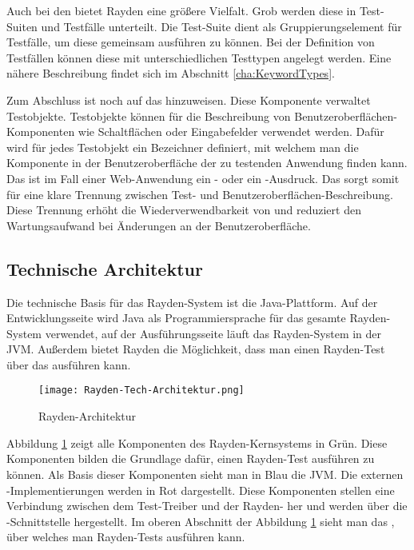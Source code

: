 \SuperPar
Auch bei den  bietet Rayden eine größere Vielfalt. Grob werden diese in Test-Suiten und Testfälle unterteilt. Die Test-Suite dient als Gruppierungselement für Testfälle, um diese gemeinsam ausführen zu können. Bei der Definition von Testfällen können diese mit unterschiedlichen Testtypen angelegt werden. Eine nähere Beschreibung findet sich im Abschnitt \ref{cha:KeywordTypes}.

\SuperPar
Zum Abschluss ist noch auf das  hinzuweisen. Diese Komponente verwaltet Testobjekte. Testobjekte können für die Beschreibung von Benutzeroberflächen-Komponenten wie Schaltflächen oder Eingabefelder verwendet werden. Dafür wird für jedes Testobjekt ein Bezeichner definiert, mit welchem man die Komponente in der Benutzeroberfläche der zu testenden Anwendung finden kann. Das ist im Fall einer Web-Anwendung ein - oder ein -Ausdruck. Das  sorgt somit für eine klare Trennung zwischen Test- und Benutzeroberflächen-Beschreibung. Diese Trennung erhöht die Wiederverwendbarkeit von  und reduziert den Wartungsaufwand bei Änderungen an der Benutzeroberfläche.

\subsection{Technische Architektur}
\label{cha:TechArch}

Die technische Basis für das Rayden-System ist die Java-Plattform. Auf der Entwicklungsseite wird Java als Programmiersprache für das gesamte Rayden-System verwendet, auf der Ausführungsseite läuft das Rayden-System in der JVM. Außerdem bietet Rayden die Möglichkeit, dass man einen Rayden-Test über das  \cite{JavaScriptApi} ausführen kann. 

\begin{figure}[h]
\centering
\texttt{[image: Rayden-Tech-Architektur.png]}
\caption{Rayden-Architektur}
\label{fig:rayden-tech-arch}
\end{figure}

\SuperPar
Abbildung \ref{fig:rayden-tech-arch} zeigt alle Komponenten des Rayden-Kernsystems in Grün. Diese Komponenten bilden die Grundlage dafür, einen Rayden-Test ausführen zu können. Als Basis dieser Komponenten sieht man in Blau die JVM. Die externen -Implementierungen werden in Rot dargestellt. Diese Komponenten stellen eine Verbindung zwischen dem Test-Treiber und der Rayden- her und werden über die -Schnittstelle hergestellt. Im oberen Abschnitt der Abbildung \ref{fig:rayden-tech-arch} sieht man das , über welches man Rayden-Tests ausführen kann.

